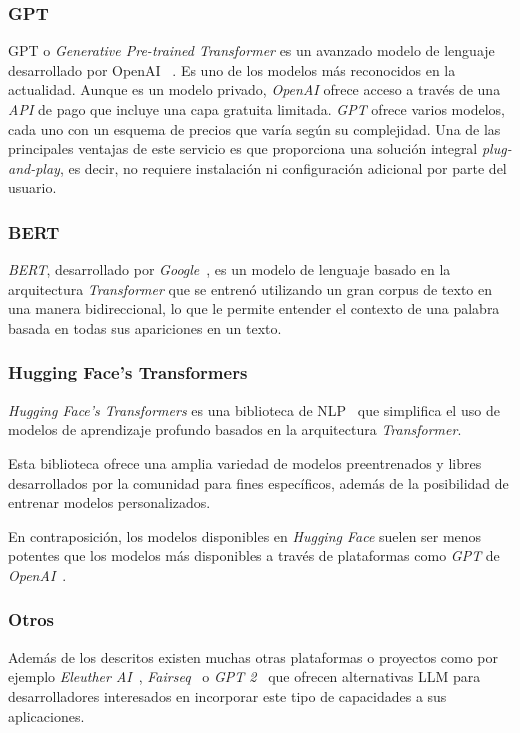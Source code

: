\subsubsection*{GPT}
GPT o \textit{Generative Pre-trained Transformer} es un avanzado modelo de lenguaje desarrollado por OpenAI
~\cite{article_brown_2020}.
Es uno de los modelos más reconocidos en la actualidad.
Aunque es un modelo privado, \textit{OpenAI} ofrece acceso a través de una \textit{API} de pago que incluye una capa
gratuita limitada.
\textit{GPT} ofrece varios modelos, cada uno con un esquema de precios que varía según su complejidad.
Una de las principales ventajas de este servicio es que proporciona una solución integral \textit{plug-and-play}, es
decir, no requiere instalación ni configuración adicional por parte del usuario.

\subsubsection*{BERT}
\textit{BERT}, desarrollado por \textit{Google}~\cite{article_devlin_2019}, es un modelo de lenguaje basado en la
arquitectura \textit{Transformer} que se entrenó utilizando un gran corpus de texto en una manera bidireccional, lo
que le permite entender el contexto de una palabra basada en todas sus apariciones en un texto.

\subsubsection*{Hugging Face's Transformers}

\textit{Hugging Face's Transformers} es una biblioteca de NLP~\cite{article_wolf_2020} que simplifica el uso de modelos
de aprendizaje profundo basados en la arquitectura \textit{Transformer}.

Esta biblioteca ofrece una amplia variedad de modelos preentrenados y libres desarrollados por la comunidad para fines
específicos, además de la posibilidad de entrenar modelos personalizados.

En contraposición, los modelos disponibles en \textit{Hugging Face}
suelen ser menos potentes que los modelos más disponibles a través de plataformas como \textit{GPT} de
\textit{OpenAI}~\cite{url_chatgpt_vs_huggingchat}.

\subsubsection*{Otros}

Además de los descritos existen muchas otras plataformas o proyectos como por ejemplo
\textit{Eleuther AI}~\cite{url_eleutherai}, \textit{Fairseq}~\cite{url_fairseq} o \textit{GPT 2}~\cite{url_gpt2}
que ofrecen alternativas LLM para desarrolladores interesados en incorporar este tipo de capacidades a sus aplicaciones.
